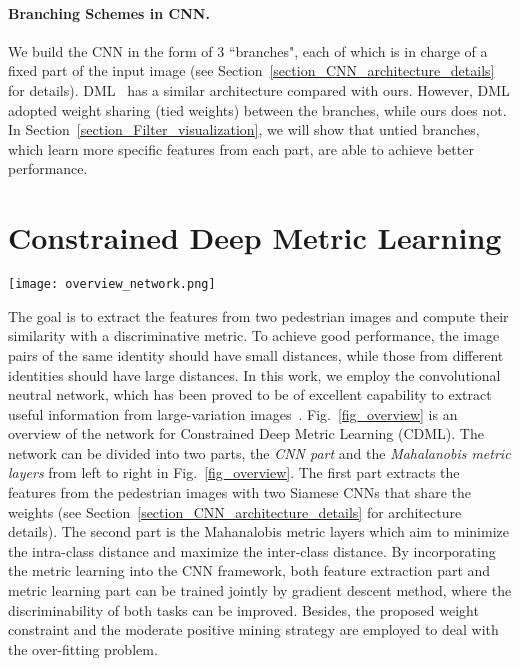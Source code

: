 \documentclass[10pt,twocolumn,letterpaper]{article}
\begin{document}
\paragraph{Branching Schemes in CNN.}
We build the CNN in the form of 3 ``branches", each of which is in charge of a fixed part of the input image (see Section~\ref{section_CNN_architecture_details} for details).
DML~\cite{yi2014deep} has a similar architecture compared with ours.
However, DML adopted weight sharing (\ie tied weights) between the branches, while ours does not. In Section~\ref{section_Filter_visualization}, we will show that untied branches, which learn more specific features from each part, are able to achieve better performance.





\section{Constrained Deep Metric Learning}
\label{section_Deep_Mahalanobis_Network}

\begin{figure*}[!htbp]
  \centering
  \texttt{[image: overview\_network.png]}
  \caption{The overview of CDML Network. Best viewed in color.}
  \label{fig_overview}
\end{figure*}

The goal is to extract the features from two pedestrian images and compute their similarity with a discriminative metric. To achieve good performance, the image pairs of the same identity should have small distances, while those from different identities should have large distances.
In this work, we employ the convolutional neutral network, which has been proved to be of excellent capability to extract useful information from large-variation images~\cite{zeiler2014visualizing}. Fig.~\ref{fig_overview} is an overview of the network for Constrained Deep Metric Learning (CDML). The network can be divided into two parts, \ie the \emph{CNN part} and the \emph{Mahalanobis metric layers} from left to right in Fig.~\ref{fig_overview}. The first part extracts the features from the pedestrian images with two Siamese CNNs that share the weights (see Section~\ref{section_CNN_architecture_details} for architecture details). The second part is the Mahanalobis metric layers which aim to minimize the intra-class distance and maximize the inter-class distance. By incorporating the metric learning into the CNN framework, both feature extraction part and metric learning part can be trained jointly by gradient descent method, where the discriminability of both tasks can be improved.
Besides, the proposed weight constraint and the moderate positive mining strategy are employed to deal with the over-fitting problem.
\end{document}
